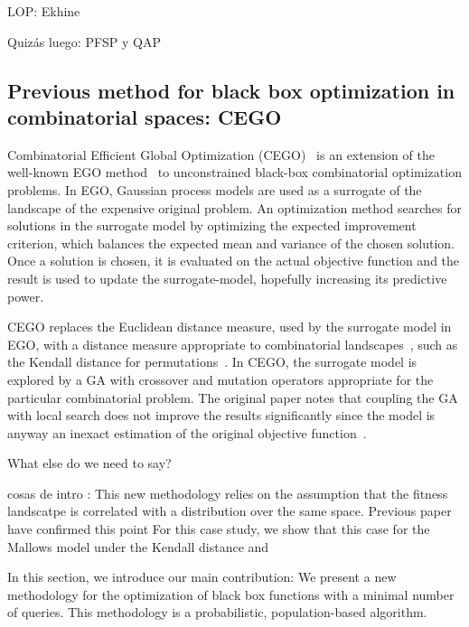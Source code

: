 \documentclass[runningheads]{llncs}
\begin{document}
LOP: Ekhine

Quizás luego: PFSP y QAP

\subsection{Previous method for black box optimization in combinatorial spaces: CEGO}



Combinatorial Efficient Global Optimization
(CEGO)~\citep{ZaeStoFriFisNauBar2014} is an extension of the well-known EGO
method~\citep{JonSchWel98go} to unconstrained black-box combinatorial
optimization problems. In EGO, Gaussian process models are used as a surrogate
of the landscape of the expensive original problem. An optimization method
searches for solutions in the surrogate model by optimizing the expected
improvement criterion, which balances the expected mean and variance of the
chosen solution. Once a solution is chosen, it is evaluated on the actual
objective function and the result is used to update the surrogate-model,
hopefully increasing its predictive power.

CEGO replaces the Euclidean distance measure, used by the surrogate model in
EGO, with a distance measure appropriate to combinatorial
landscapes~\citep{ZaeStoBar2014:ppsn}, such as the Kendall distance for
permutations~\citep{?}. In CEGO, the surrogate model is explored by a GA with
crossover and mutation operators appropriate for the particular combinatorial
problem. The original paper notes that coupling the GA with local search does
not improve the results significantly since the model is anyway an inexact
estimation of the original objective
function~\citep[p.~875]{ZaeStoFriFisNauBar2014}.

What else do we need to say?

\newcommand{\minit}{\ensuremath{m_\text{ini}}\xspace}

\newcommand{\FEmax}{\ensuremath{\textit{FE}_{\max}}}

cosas de intro : 
This new methodology relies on the assumption that the fitness landscatpe is correlated with a distribution over the same space. 
Previous paper have confirmed this point
For this case study, we show that this case for the Mallows model under the Kendall distance and 



In this section, we introduce our main contribution: We present a new methodology for the optimization of black box functions with a minimal number of queries. This methodology is a probabilistic, population-based algorithm. 
\end{document}

